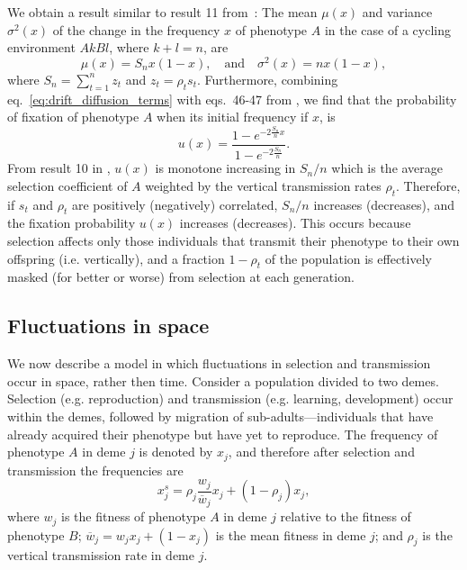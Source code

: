 \documentclass[14pt]{extarticle}
\begin{document}
We obtain a result similar to result 11 from~\citet{Ram2018}:
The mean $\mu(x)$ and variance $\sigma^2(x)$ of the change in the frequency $x$ of phenotype $A$ in the case of a cycling environment $AkBl$, where $k+l=n$, are
\begin{equation} \label{eq:drift_diffusion_terms}
\mu(x) = S_n x(1-x),
\quad \text{and} \quad
\sigma^2(x) = n x (1-x),
\end{equation}
where $S_n = \sum_{t=1}^{n}{z_t}$ and $z_t = \rho_t s_t$.
Furthermore, combining eq.~\ref{eq:drift_diffusion_terms} with eqs.~46-47 from \citet{Ram2018}, we find that the probability of fixation of phenotype $A$ when its initial frequency if $x$, is
\begin{equation}
u(x) = \frac{1 - e^{-2 \frac{S_n}{n} x}}{1 - e^{-2 \frac{S_n}{n}}}.
\end{equation}
From result 10 in \citet{Ram2018}, $u(x)$ is monotone increasing in $S_n/n$ which is the average selection coefficient of $A$ weighted by the vertical transmission rates $\rho_t$.
Therefore, if $s_t$ and $\rho_t$ are positively (negatively) correlated, $S_n/n$ increases (decreases), and the fixation probability $u(x)$ increases (decreases). 
This occurs because selection  affects only those individuals that transmit their phenotype to their own offspring (i.e. vertically), and a fraction $1-\rho_t$ of the population is effectively masked (for better or worse) from selection at each generation.

\subsection*{Fluctuations in space}

We now describe a model in which fluctuations in selection and transmission occur in space, rather then time.
Consider a population divided to two demes.
Selection (e.g. reproduction) and transmission (e.g. learning, development) occur within the demes, followed by migration of sub-adults---individuals that have already acquired their phenotype but have yet to reproduce.
The frequency of phenotype $A$ in deme $j$ is denoted by $x_j$, and therefore after selection and transmission the frequencies are 
\begin{equation} \label{eq:migration_model_selection_transmission}
x_j^s = \rho_j \frac{w_j}{\overline{w}_j} x_j + (1-\rho_j) x_j,
\end{equation}
where $w_j$ is the fitness of phenotype $A$ in deme $j$ relative to the fitness of phenotype $B$; $\overline{w}_j=w_j x_j + (1-x_j)$ is the mean fitness in deme $j$; and $\rho_j$ is the vertical transmission rate in deme $j$.
\end{document}
